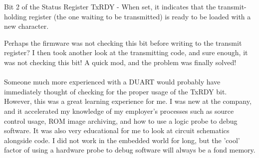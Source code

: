 Bit 2 of the Status Register TxRDY - When set, it indicates that the
transmit-holding register (the one waiting to be transmitted) is ready to be
loaded with a new character.

Perhaps the firmware was not checking this bit before writing to the transmit
register? I then took another look at the transmitting code, and sure enough, it
was not checking this bit! A quick mod, and the problem was finally solved!

\paragraph {}
Someone much more experienced with a DUART would probably have immediately
thought of checking for the proper usage of the TxRDY bit. However, this was a
great learning experience for me. I was new at the company, and it accelerated
my knowledge of my employer's processes such as source control usage, ROM image
archiving, and how to use a logic probe to debug software. It was also very
educational for me to look at circuit schematics alongside code. I did not work
in the embedded world for long, but the 'cool' factor of using a hardware probe
to debug software will always be a fond memory.